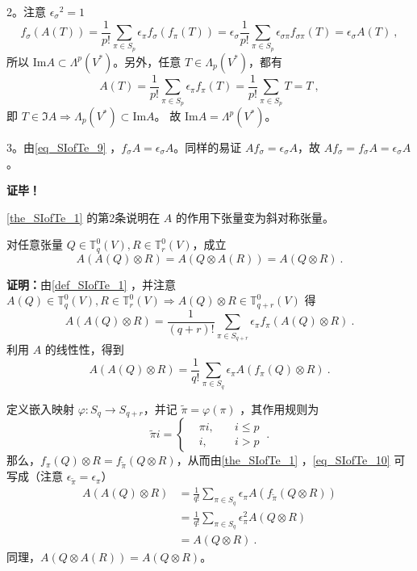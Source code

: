 2。注意 ${\epsilon_\sigma}^2=1$
\begin{equation}\label{eq_SIofTe_9}
f_\sigma(A(T))=\frac{1}{p!}\sum_{\pi\in S_p}\epsilon_\pi f_\sigma(f_\pi(T))=\epsilon_\sigma\frac{1}{p!}\sum_{\pi\in S_p}\epsilon_{\sigma\pi} f_{\sigma\pi}(T)=\epsilon_\sigma A(T)~,
\end{equation}
 所以 $\mathrm{Im} A\subset\Lambda^p(V^*)$。另外，任意 $T\in\Lambda_p(V^*)$，都有
 \begin{equation}\label{eq_SIofTe_11}
 A(T)=\frac{1}{p!}\sum_{\pi\in S_p}\epsilon_\pi f_\pi(T)=\frac{1}{p!}\sum_{\pi\in S_p}T=T~,
 \end{equation}
 即 $T\in \Im A\Rightarrow\Lambda_p(V^*)\subset\mathrm{Im} A$。
 故 $\mathrm{Im} A=\Lambda^p(V^*)$。

3。由\autoref{eq_SIofTe_9} ，$f_\sigma A=\epsilon_\sigma A$。同样的易证 $Af_\sigma=\epsilon_\sigma A$，故 $Af_\sigma=f_\sigma A=\epsilon_\sigma A$。

\textbf{证毕！}

\autoref{the_SIofTe_1} 的第2条说明在 $A$ 的作用下张量变为斜对称张量。

\begin{theorem}{}\label{the_SIofTe_2}
对任意张量 $Q\in\mathbb T_q^0(V),R\in\mathbb T_r^0(V)$，成立
\begin{equation}
A(A(Q)\otimes R)=A(Q\otimes A(R))=A(Q\otimes R)~.
\end{equation}
\end{theorem}
\textbf{证明：}由\autoref{def_SIofTe_1} ，并注意 $A(Q)\in\mathbb T_q^0(V),R\in\mathbb T_r^0(V)\Rightarrow A(Q)\otimes R\in\mathbb T_{q+r}^0(V)$ 得
\begin{equation}
A(A(Q)\otimes R)=\frac{1}{(q+r)!}\sum_{\pi\in S_{q+r}}\epsilon_\pi f_{\pi}(A(Q)\otimes R)~.
\end{equation}
 利用 $A$ 的线性性，得到
 \begin{equation}\label{eq_SIofTe_10}
 A(A(Q)\otimes R)=\frac{1}{q!}\sum_{\pi\in S_q}\epsilon_\pi A(f_{\pi}(Q)\otimes R)~.
 \end{equation}
 
 定义嵌入映射 $\varphi:S_q\rightarrow S_{q+r}$，并记 $\tilde \pi=\varphi(\pi)$ ，其作用规则为
 \begin{equation}
 \tilde\pi i=\left\{\begin{aligned}
 &\pi i,\quad &i\leq p\\
 &i,\quad &i>p
 \end{aligned}\right.~.
 \end{equation}
 那么，$f_\pi(Q)\otimes R=f_{\tilde\pi}(Q\otimes R)$，从而由\autoref{the_SIofTe_1} ，\autoref{eq_SIofTe_10} 可写成（注意 $\epsilon_{\tilde\pi}=\epsilon_\pi$）
 \begin{equation}
 \begin{aligned}
 A(A(Q)\otimes R)&=\frac{1}{q!}\sum_{\pi\in S_q}\epsilon_\pi A(f_{\tilde\pi}(Q\otimes R))\\
&=\frac{1}{q!}\sum_{\pi\in S_q}\epsilon_\pi^2 A(Q\otimes R)\\
&=A(Q\otimes R)~.
 \end{aligned}
 \end{equation}
 同理，$A(Q\otimes A(R))=A(Q\otimes R)$。

